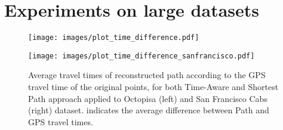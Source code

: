 \documentclass[5p]{elsarticle}
\begin{document}
\section{Experiments on large datasets} \label{large-dataset}
\begin{figure*}[htbp]
\centering
\begin{minipage}[b]{0.45\linewidth}
\centering
\texttt{[image: images/plot\_time\_difference.pdf]}


\end{minipage}
\quad
\begin{minipage}[b]{0.45\linewidth}
  
\centering
\texttt{[image: images/plot\_time\_difference\_sanfrancisco.pdf]}

\end{minipage}
\caption{Average travel times of reconstructed path according to the GPS travel time of the original points, for both Time-Aware and Shortest Path approach applied to Octopisa (left)  and San Francisco Cabs (right) dataset.  indicates the average difference between Path and
GPS travel times.}\label{time_difference_Compare}
\end{figure*}
\end{document}
